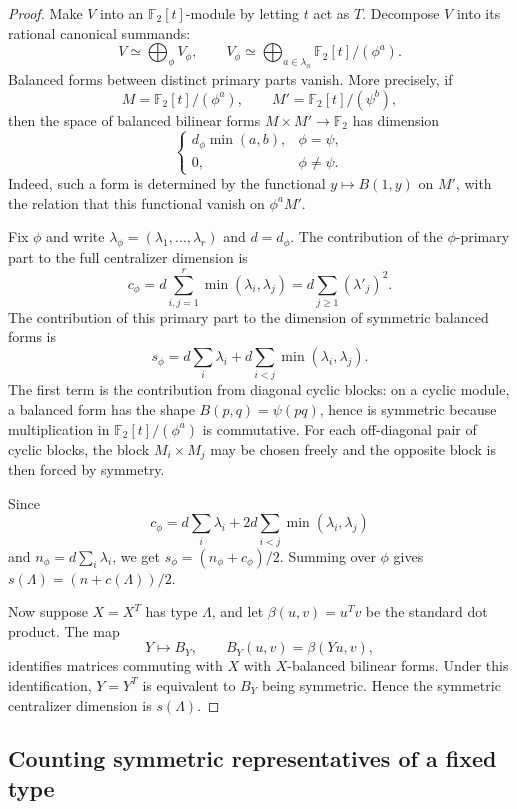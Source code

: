 \documentclass[11pt]{amsart}
\theoremstyle{remark}
\numberwithin{equation}{section}
\newcommand{\F}{\mathbb F}
\begin{document}
\begin{proof}
Make $V$ into an $\F_2[t]$-module by letting $t$ act as $T$.  Decompose $V$ into its rational canonical summands:
\[
        V\simeq\bigoplus_\phi V_\phi,
        \qquad
        V_\phi\simeq\bigoplus_{a\in\lambda_\phi}\F_2[t]/(\phi^a).
\]
Balanced forms between distinct primary parts vanish.  More precisely, if
\[
        M=\F_2[t]/(\phi^a),\qquad M'=\F_2[t]/(\psi^b),
\]
then the space of balanced bilinear forms $M\times M'\to\F_2$ has dimension
\[
        \begin{cases}
        d_\phi\min(a,b),&\phi=\psi,\\
        0,&\phi\ne\psi.
        \end{cases}
\]
Indeed, such a form is determined by the functional $y\mapsto B(1,y)$ on $M'$, with the relation that this functional vanish on $\phi^aM'$.

Fix $\phi$ and write $\lambda_\phi=(\lambda_1,\ldots,\lambda_r)$ and $d=d_\phi$.  The contribution of the $\phi$-primary part to the full centralizer dimension is
\[
        c_\phi
        =d\sum_{i,j=1}^r\min(\lambda_i,\lambda_j)
        =d\sum_{j\geq1}(\lambda'_j)^2.
\]
The contribution of this primary part to the dimension of symmetric balanced forms is
\[
        s_\phi
        =d\sum_i\lambda_i+d\sum_{i<j}\min(\lambda_i,\lambda_j).
\]
The first term is the contribution from diagonal cyclic blocks: on a cyclic module, a balanced form has the shape $B(p,q)=\psi(pq)$, hence is symmetric because multiplication in $\F_2[t]/(\phi^a)$ is commutative.  For each off-diagonal pair of cyclic blocks, the block $M_i\times M_j$ may be chosen freely and the opposite block is then forced by symmetry.

Since
\[
        c_\phi=d\sum_i\lambda_i+2d\sum_{i<j}\min(\lambda_i,\lambda_j)
\]
and $n_\phi=d\sum_i\lambda_i$, we get $s_\phi=(n_\phi+c_\phi)/2$.  Summing over $\phi$ gives $s(\Lambda)=(n+c(\Lambda))/2$.

Now suppose $X=X^T$ has type $\Lambda$, and let $\beta(u,v)=u^Tv$ be the standard dot product.  The map
\[
        Y\longmapsto B_Y,
        \qquad
        B_Y(u,v)=\beta(Yu,v),
\]
identifies matrices commuting with $X$ with $X$-balanced bilinear forms.  Under this identification, $Y=Y^T$ is equivalent to $B_Y$ being symmetric.  Hence the symmetric centralizer dimension is $s(\Lambda)$.
\end{proof}

\subsection{Counting symmetric representatives of a fixed type}
\end{document}
